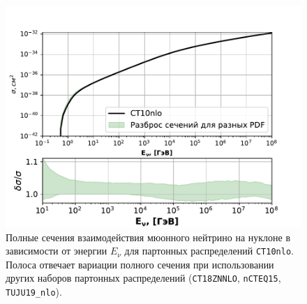 \begin{figure}[!h]
\centering
\includegraphics[width=\linewidth]{images/NuProp/xs_vs_enu.pdf}
\caption{Полные сечения взаимодействия мюонного нейтрино на нуклоне в зависимости от энергии $E_\nu$ для партонных распределений \texttt{CT10nlo}. Полоса отвечает вариации полного сечения при использовании других наборов партонных распределений (\texttt{CT18ZNNLO}, \texttt{nCTEQ15}, \texttt{TUJU19\_nlo}).} 
\label{fig:xsec_total}
\end{figure}
